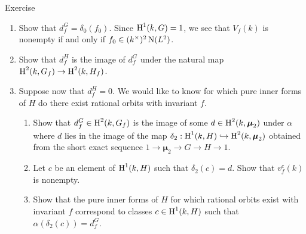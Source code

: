 \begin{enonce*}[remark]{Exercise}
\begin{enumerate}
  \item Show that $d_f^G=\delta_0(f_0)$. Since $\operatorname{H}^1(k,G)=1$, we see that 
    $V_f(k)$ is nonempty if and only if $f_0\in (k^\times)^2 \operatorname{N}(L^2)$. 
  \item Show that $d_f^H$ is the image of $d_f^G$ under the natural map 
    $\operatorname{H}^2(k,G_f) \to \operatorname{H}^2(k,H_f)$. 
  \item Suppose now that $d_f^H=0$. We would like to know for which pure inner 
    forms of $H$ do there exist rational orbits with invariant $f$. 
     \begin{enumerate}
       \item Show that $d_f^G\in \operatorname{H}^2(k,G_f)$ is the image of some 
         $d\in \operatorname{H}^2(k,\boldsymbol\mu_2)$ under $\alpha$ where $d$ lies in the 
         image of the map $\delta_2:\operatorname{H}^1(k,H) \hookrightarrow \operatorname{H}^2(k,\boldsymbol\mu_2)$ 
         obtained from the short exact sequence $1\to \boldsymbol\mu_2 \to G\to H\to 1$. 
       \item Let $c$ be an element of $\operatorname{H}^1(k,H)$ such that $\delta_2(c)=d$. 
         Show that $v_f^c(k)$ is nonempty. 
       \item Show that the pure inner forms of $H$ for which rational orbits 
         exist with invariant $f$ correspond to classes $c\in \operatorname{H}^1(k,H)$ such 
         that $\alpha(\delta_2(c))=d_f^G$. 
     \end{enumerate}
\end{enumerate}
\end{enonce*}




